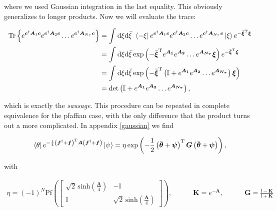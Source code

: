 \documentclass{article}
\begin{document}
where we used Gaussian integration in the last equality. This obviously generalizes to longer products. Now we will evaluate the trace:

\begin{align}
	\mathrm{Tr} \left\{ e^{\boldsymbol{c}^{\dagger}\boldsymbol{A}_{1}\boldsymbol{c} } e^{\boldsymbol{c}^{\dagger}\boldsymbol{A}_{2}\boldsymbol{c} }\dots e^{\boldsymbol{c}^{\dagger}\boldsymbol{A}_{N_\tau}\boldsymbol{c} }\right\} &= \int_{ }^{ } \mathrm{d}\xi \mathrm{d}\bar{\xi}\,\, \bra{-\xi} e^{\boldsymbol{c}^{\dagger}\boldsymbol{A}_{1}\boldsymbol{c} } e^{\boldsymbol{c}^{\dagger}\boldsymbol{A}_{2}\boldsymbol{c} }\dots e^{\boldsymbol{c}^{\dagger}\boldsymbol{A}_{N_\tau}\boldsymbol{c} }\ket{\xi}e^{-\bar{\boldsymbol{\xi} }^{\mathrm{T}  }\boldsymbol{\xi} } \nonumber \\
	&=\int_{ }^{ } \mathrm{d}\xi \mathrm{d} \bar{\xi} \exp \left( -\bar{\boldsymbol{\xi} }^{\mathrm{T}  }e^{\boldsymbol{A_{1} } } e^{\boldsymbol{A_{2} } } \dots e^{\boldsymbol{A_{N_\tau}}  }\boldsymbol{\xi}   \right)  e^{-\bar{\boldsymbol{\xi} }^{\mathrm{T}  }\boldsymbol{\xi} } \nonumber \\
	&= \int_{ }^{ } \mathrm{d}\xi \mathrm{d} \bar{\xi} \exp \left( -\bar{\boldsymbol{\xi} }^{\mathrm{T}  }\left(\mathbb{I} + e^{\boldsymbol{A_{1} } } e^{\boldsymbol{A_{2} } } \dots e^{\boldsymbol{A_{N_\tau}}}\right)\boldsymbol{\xi}   \right)\nonumber \\
	&= \mathrm{det} \left(\mathbb{I} + e^{\boldsymbol{A_{1} } } e^{\boldsymbol{A_{2} } } \dots e^{\boldsymbol{A_{N_\tau}}}\right),
\end{align}


which is exactly the \textit{sausage}. This procedure can be repeated in complete equivalence for the pfaffian case, with the only difference that the product turns out a more complicated. In appendix \ref{gaussian} we find

\begin{align}
	\bra{\theta} e^{-\frac{1}{4}\left(\boldsymbol{f}^{\dagger} + \boldsymbol{f} \right)^{\mathrm{T}} \boldsymbol{A} \left(\boldsymbol{f}^{\dagger} + \boldsymbol{f} \right) } \ket{\psi} = \eta \exp \left( -\frac{1}{2}\left(\bar{\boldsymbol{\theta}}+ \boldsymbol{\psi}\right)^{\mathrm{T}}\boldsymbol{G} \left(\bar{\boldsymbol{\theta}}+ \boldsymbol{\psi}\right)  \right),
\end{align}

with

\begin{align}
	\eta = \left(-1\right)^{N} \mathrm{Pf} \left(\begin{bmatrix}
		\sqrt{2} \,\mathrm{sinh} \left(\frac{\boldsymbol{A} }{4}\right) & -\mathbb{I} \\
		\mathbb{I} & \sqrt{2} \,\mathrm{sinh} \left(\frac{\boldsymbol{A} }{4} \right) 
	\end{bmatrix} \right), \quad\quad\quad \boldsymbol{K}=e^{-\boldsymbol{A} }, \quad\quad \quad \boldsymbol{G} = \frac{\mathbb{I} - \boldsymbol{K} }{\mathbb{I} + \boldsymbol{K} } 
\end{align}
\end{document}
